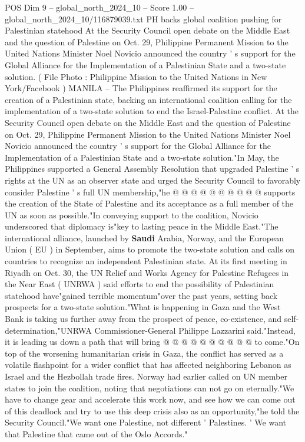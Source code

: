 \begin{textsample}{POS Dim 9 – global\_north\_2024\_10 – Score 1.00 – global\_north\_2024\_10/116879039.txt}  \label{ex:f9_pos_395}
PH backs global coalition pushing for Palestinian statehood At the Security Council open debate on the Middle East and the question of Palestine on Oct. 29, Philippine Permanent Mission to the United Nations Minister Noel Novicio announced the country ' s support for the Global Alliance for the Implementation of a Palestinian State and a two-state solution. ( File Photo : Philippine Mission to the United Nations in New York/Facebook ) MANILA -- The Philippines reaffirmed its support for the creation of a Palestinian state, backing an international coalition calling for the implementation of a two-state solution to end the Israel-Palestine conflict.
At the Security Council open debate on the Middle East and the question of Palestine on Oct. 29, Philippine Permanent Mission to the United Nations Minister Noel Novicio announced the country ' s support for the Global Alliance for the Implementation of a Palestinian State and a two-state solution."In May, the Philippines supported a General Assembly Resolution that upgraded Palestine ' s rights at the UN as an observer state and urged the Security Council to favorably consider Palestine ' s full UN membership,"he @ @ @ @ @ @ @ @ @ @ supports the creation of the State of Palestine and its acceptance as a full member of the UN as soon as possible."In conveying support to the coalition, Novicio underscored that diplomacy is"key to lasting peace in the Middle East."The international alliance, launched by \textbf{Saudi} Arabia, Norway, and the European Union ( EU ) in September, aims to promote the two-state solution and calls on countries to recognize an independent Palestinian state.
At its first meeting in Riyadh on Oct. 30, the UN Relief and Works Agency for Palestine Refugees in the Near East ( UNRWA ) said efforts to end the possibility of Palestinian statehood have"gained terrible momentum"over the past years, setting back prospects for a two-state solution."What is happening in Gaza and the West Bank is taking us further away from the prospect of peace, co-existence, and self-determination,"UNRWA Commissioner-General Philippe Lazzarini said."Instead, it is leading us down a path that will bring @ @ @ @ @ @ @ @ @ @ to come."On top of the worsening humanitarian crisis in Gaza, the conflict has served as a volatile flashpoint for a wider conflict that has affected neighboring Lebanon as Israel and the Hezbollah trade fires.
Norway had earlier called on UN member states to join the coalition, noting that negotiations can not go on eternally."We have to change gear and accelerate this work now, and see how we can come out of this deadlock and try to use this deep crisis also as an opportunity,"he told the Security Council."We want one Palestine, not different ' Palestines. ' We want that Palestine that came out of the Oslo Accords."

\end{textsample}

